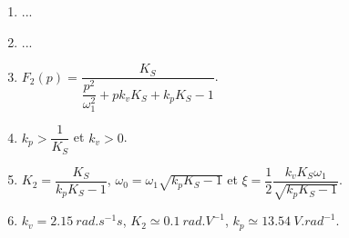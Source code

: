 %
%
%
%
%
%
%
%
%
%
%
%
%
%
%
%
%
%
%
%
%
\begin{enumerate}
\item ...
\item ...
\item $F_2(p)=\dfrac{K_S}{\dfrac{p^2}{\omega_1^2}+pk_v K_S +k_pK_S - 1}$.
\item $k_p>\dfrac{1}{K_S}$ et $k_v>0$.
\item $K_2 = \dfrac{K_S}{k_p K_S - 1}$, $\omega_0 = \omega_1\sqrt{k_p K_S - 1}$ et $\xi = \dfrac{1}{2}\dfrac{k_vK_S\omega_1}{\sqrt{k_p K_S - 1}}$.
\item $k_v = \SI{2,15}{rad.s^{-1}s}$, $K_2 \simeq \SI{0,1}{rad.V^{-1}}$, $k_p \simeq \SI{13,54}{V.rad^{-1}}$.
\end{enumerate}